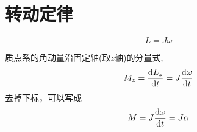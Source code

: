 \section{转动定律}
\vspace*{-1em}
\begin{equation}
L=J\omega
\end{equation}
\par {}质点系的角动量沿固定轴(取$z$轴)的分量式,
\begin{equation}
M_z=\frac{{\rm{d}} L_z}{{\rm{d}} t}=J\frac{{\rm{d}} \omega}{{\rm{d}} t}
\end{equation}
去掉下标，可以写成
\begin{equation}
M=J\frac{{\rm{d}} \omega}{{\rm{d}} t}=J\alpha
\end{equation}
